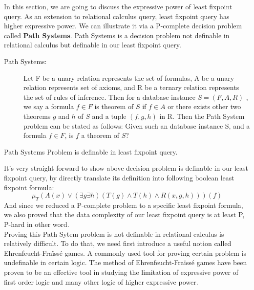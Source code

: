 In this section, we are going to discuss the expressive power of least fixpoint query. As an extension to relational calculus query, least fixpoint query has higher expressive power. We can illustrate it via a P-complete decision problem called \textbf{Path Systems}\cite{Cook}. Path Systems is a decision problem not definable in relational calculus but definable in our least fixpoint query. \\

\begin{description}
\item[Path Systems:]
Let F be a unary relation represents the set of formulas, A be a unary relation represents set of axioms, and R be a ternary relation represents the set of rules of inference. Then for a database instance $S = (F, A, R) $ , we say a formula $f\in F$ is theorem of $S$ if $f\in A$ or there exists other two theorems $g$ and $h $ of $S$ and a tuple $(f, g, h)$ in R. Then the Path System problem can be stated as follows: Given such an database instance S, and a formula $f\in F$, is $f$ a theorem of $S$?\\
\end{description}

\begin{claim}
Path Systems Problem is definable in least fixpoint query.
\end{claim}

It's very straight forward to show above decision problem is definable in our least fixpoint query, by directly translate its definition into following boolean least fixpoint formula:
$$ \mu_T(A(x)\lor (\exists g \exists h)(T(g)\land T(h) \land R(x, g, h)))(f) $$
And since we reduced a P-complete problem to a specific least fixpoint formula, we also proved that the data complexity of our least fixpoint query is at least P, P-hard in other word.\\

Proving this Path Sytem problem is not definable in relational calculus is relatively difficult. To do that, we need first introduce a useful notion called Ehrenfeucht-Fra\"iss\'e games. A commonly used tool for proving certain problem is undefinable in certain logic. The method of Ehrenfeucht-Fra\"iss\'e games have been proven to be an effective tool in studying the limitation of expressive power of first order logic and many other logic of higher expressive power.

